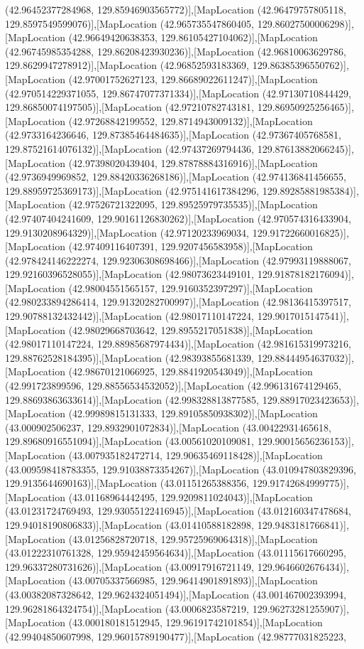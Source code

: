 (42.96452377284968, 129.85946903565772)],[MapLocation (42.96479757805118, 129.8597549599076)],[MapLocation (42.965735547860405, 129.86027500006298)],[MapLocation (42.96649420638353, 129.86105427104062)],[MapLocation (42.96745985354288, 129.86208423930236)],[MapLocation (42.96810063629786, 129.8629947278912)],[MapLocation (42.96852593183369, 129.86385396550762)],[MapLocation (42.97001752627123, 129.86689022611247)],[MapLocation (42.970514229371055, 129.86747077371334)],[MapLocation (42.97130710844429, 129.86850074197505)],[MapLocation (42.97210782743181, 129.86950925256465)],[MapLocation (42.97268842199552, 129.8714943009132)],[MapLocation (42.9733164236646, 129.87385464484635)],[MapLocation (42.97367405768581, 129.87521614076132)],[MapLocation (42.97437269794436, 129.87613882066245)],[MapLocation (42.97398020439404, 129.87878884316916)],[MapLocation (42.9736949969852, 129.88420336268186)],[MapLocation (42.974136841456655, 129.88959725369173)],[MapLocation (42.975141617384296, 129.89285881985384)],[MapLocation (42.97526721322095, 129.89525979735535)],[MapLocation (42.97407404241609, 129.90161126830262)],[MapLocation (42.970574316433904, 129.9130208964329)],[MapLocation (42.97120233969034, 129.91722660016825)],[MapLocation (42.97409116407391, 129.9207456583958)],[MapLocation (42.978424146222274, 129.92306308698466)],[MapLocation (42.97993119888067, 129.92160396528055)],[MapLocation (42.98073623449101, 129.91878182176094)],[MapLocation (42.98004551565157, 129.9160352397297)],[MapLocation (42.980233894286414, 129.91320282700997)],[MapLocation (42.98136415397517, 129.90788132432442)],[MapLocation (42.98017110147224, 129.9017015147541)],[MapLocation (42.98029668703642, 129.8955217051838)],[MapLocation (42.98017110147224, 129.88985687974434)],[MapLocation (42.981615319973216, 129.88762528184395)],[MapLocation (42.98393855681339, 129.88444954637032)],[MapLocation (42.98670121066925, 129.8841920543049)],[MapLocation (42.991723899596, 129.88556534532052)],[MapLocation (42.996131674129465, 129.88693863633614)],[MapLocation (42.998328813877585, 129.88917023423653)],[MapLocation (42.99989815131333, 129.89105850938302)],[MapLocation (43.000902506237, 129.8932901072834)],[MapLocation (43.00422931465618, 129.89680916551094)],[MapLocation (43.00561020109081, 129.90015656236153)],[MapLocation (43.007935182472714, 129.90635469118428)],[MapLocation (43.009598418783355, 129.91038873354267)],[MapLocation (43.010947803829396, 129.9135644690163)],[MapLocation (43.01151265388356, 129.91742684999775)],[MapLocation (43.01168964442495, 129.9209811024043)],[MapLocation (43.01231724769493, 129.93055122416945)],[MapLocation (43.012160347478684, 129.94018190806833)],[MapLocation (43.01410588182898, 129.9483181766841)],[MapLocation (43.01256828720718, 129.95725969064318)],[MapLocation (43.01222310761328, 129.95942459564634)],[MapLocation (43.01115617660295, 129.96337280731626)],[MapLocation (43.00917916721149, 129.9646602676434)],[MapLocation (43.00705337566985, 129.96414901891893)],[MapLocation (43.00382087328642, 129.9624324051494)],[MapLocation (43.001467002393994, 129.96281864324754)],[MapLocation (43.0006823587219, 129.96273281255907)],[MapLocation (43.000180181512945, 129.96191742101854)],[MapLocation (42.99404850607998, 129.96015789190477)],[MapLocation (42.98777031825223, 